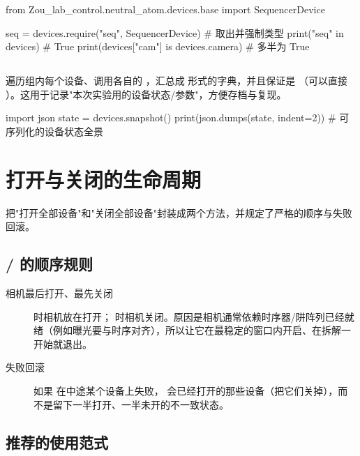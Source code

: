 \documentclass[11pt,oneside,openany]{book}
\begin{document}
\begin{codeblock}[Python]
from Zou_lab_control.neutral_atom.devices.base import SequencerDevice

seq = devices.require("seq", SequencerDevice)   # 取出并强制类型
print("seq" in devices)                          # True
print(devices["cam"] is devices.camera)          # 多半为 True
\end{codeblock}

\subsection{}

 遍历组内每个设备、调用各自的 ，汇总成  形式的字典，并且保证是 （可以直接 ）。这用于记录"本次实验用的设备状态/参数"，方便存档与复现。

\begin{codeblock}[Python]
import json
state = devices.snapshot()
print(json.dumps(state, indent=2))   # 可序列化的设备状态全景
\end{codeblock}

\section{打开与关闭的生命周期}

 把"打开全部设备"和"关闭全部设备"封装成两个方法，并规定了严格的顺序与失败回滚。

\subsection{ /  的顺序规则}

\begin{description}
\item[相机最后打开、最先关闭]  时相机放在打开； 时相机关闭。原因是相机通常依赖时序器/阱阵列已经就绪（例如曝光要与时序对齐），所以让它在最稳定的窗口内开启、在拆解一开始就退出。
\item[失败回滚] 如果  在中途某个设备上失败， 会已经打开的那些设备（把它们关掉），而不是留下一半打开、一半未开的不一致状态。
\end{description}

\subsection{推荐的使用范式}
\end{document}
